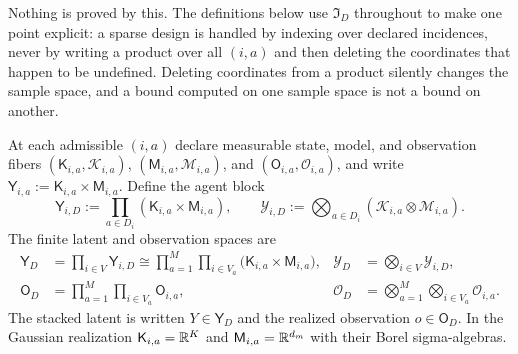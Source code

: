 Nothing is proved by this. The definitions below use $\mathfrak I_D$ throughout to make one point explicit: a sparse design is handled by indexing over declared incidences, never by writing a product over all $(i,a)$ and then deleting the coordinates that happen to be undefined. Deleting coordinates from a product silently changes the sample space, and a bound computed on one sample space is not a bound on another.

\medskip
{}
At each admissible $(i,a)$ declare measurable state, model, and observation fibers $(\mathsf K_{i,a},\mathscr K_{i,a})$, $(\mathsf M_{i,a},\mathscr M_{i,a})$, and $(\mathsf O_{i,a},\mathscr O_{i,a})$, and write $\mathsf Y_{i,a}:=\mathsf K_{i,a}\times\mathsf M_{i,a}$. Define the agent block
\[
\mathsf Y_{i,D}:=\prod_{a\in D_i}(\mathsf K_{i,a}\times\mathsf M_{i,a}),
\qquad
\mathscr Y_{i,D}:=\bigotimes_{a\in D_i}(\mathscr K_{i,a}\otimes\mathscr M_{i,a}).
\]
The finite latent and observation spaces are
\begin{align}
\mathsf Y_D&=\prod_{i\in V}\mathsf Y_{i,D}
\cong\prod_{a=1}^{M}\prod_{i\in V_a}\bigl(\mathsf K_{i,a}\times\mathsf M_{i,a}\bigr),
&\mathscr Y_D&=\bigotimes_{i\in V}\mathscr Y_{i,D},
\label{eq:prob-latent-space}\\
\mathsf O_D&=\prod_{a=1}^{M}\prod_{i\in V_a}\mathsf O_{i,a},
&\mathscr O_D&=\bigotimes_{a=1}^{M}\bigotimes_{i\in V_a}\mathscr O_{i,a}.
\label{eq:prob-observation-space}
\end{align}
The stacked latent is written $Y\in\mathsf Y_D$ and the realized observation $o\in\mathsf O_D$. In the Gaussian realization $\mathsf K_{i,a}=\mathbb R^{K}$ and $\mathsf M_{i,a}=\mathbb R^{d_m}$ with their Borel sigma-algebras. 
\medskip

